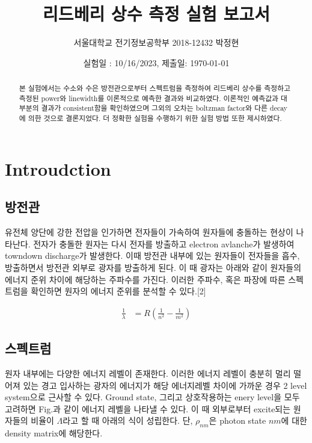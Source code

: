 \documentclass[%
 reprint,
 amsmath,amssymb,
 aps,
]{revtex4-2}
\begin{document}
\title{리드베리 상수 측정 실험 보고서}

\author{서울대학교 전기정보공학부 2018-12432 박정현}
\date{실험일 : 10/16/2023, 제출일: \today}%

\begin{abstract}
본 실험에서는 수소와 수은 방전관으로부터 스펙트럼을 측정하여 리드베리 상수를 측정하고 측정된 power와 linewidth를 이론적으로 예측한 결과와 비교하였다. 이론적인 예측값과 대부분의 결과가 consistent함을 확인하였으며 그외의 오차는 boltzman factor와 다른 decay에 의한 것으로 결론지었다. 더 정확한 실험을 수행하기 위한 실험 방법 또한 제시하였다.
\end{abstract}

\maketitle


\section{\label{sec:level1}Introudction}
\subsection{\label{sec:level2}방전관}
유전체 양단에 강한 전압을 인가하면 전자들이 가속하여 원자들에 충돌하는 현상이 나타난다. 전자가 충돌한 원자는 다시 전자를 방출하고 electron avlanche가 발생하여 towndown discharge가 발생한다.  이때 방전관 내부에 있는 원자들이 전자들을 흡수, 방출하면서 방전관 외부로 광자를 방출하게 된다. 이 때 광자는 아래와 같이 원자들의 에너지 준위 차이에 해당하는 주파수를 가진다. 이러한 주파수, 혹은 파장에 따른 스펙트럼을 확인하면 원자의 에너지 준위를 분석할 수 있다.[2]

\begin{align}
	\frac{1}{\lambda} &= R\left(\frac{1}{n^{2}}-\frac{1}{m^{2}}\right)	\label{eq:rydbery}
\end{align}

\subsection{\label{sec:level2}스펙트럼}
원자 내부에는 다양한 에너지 레벨이 존재한다. 이러한 에너지 레벨이 충분히 멀리 떨어져 있는 경고 입사하는 광자의 에너지가 해당 에너지레벨 차이에 가까운 경우 2 level system으로 근사할 수 있다. Ground state, 그리고 상호작용하는 enery level을 모두 고려하면 Fig.\label{fig:Level}과 같이 에너지 레벨을 나타낼 수 있다. 이 때 외부로부터 excite되는 원자들의 비율이 $\Lambda$라고 할 때 아래의 식이 성립한다. 단, $\rho_{nm}$은 photon state $nm$에 대한 density matrix에 해당한다.
\end{document}
